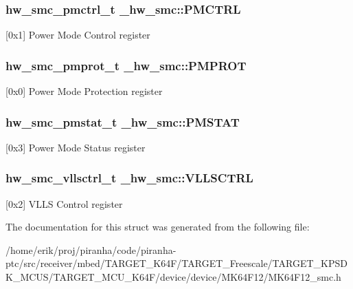 \subsubsection[{\texorpdfstring{P\+M\+C\+T\+RL}{PMCTRL}}]{ {\bf hw\+\_\+smc\+\_\+pmctrl\+\_\+t} \+\_\+hw\+\_\+smc\+::\+P\+M\+C\+T\+RL}\hypertarget{struct__hw__smc_ab8716e4edafb265314978c3aa5387fc3}{}\label{struct__hw__smc_ab8716e4edafb265314978c3aa5387fc3}
\mbox{[}0x1\mbox{]} Power Mode Control register 
\subsubsection[{\texorpdfstring{P\+M\+P\+R\+OT}{PMPROT}}]{ {\bf hw\+\_\+smc\+\_\+pmprot\+\_\+t} \+\_\+hw\+\_\+smc\+::\+P\+M\+P\+R\+OT}\hypertarget{struct__hw__smc_aed2e076c47d58654e18030aeb33a8787}{}\label{struct__hw__smc_aed2e076c47d58654e18030aeb33a8787}
\mbox{[}0x0\mbox{]} Power Mode Protection register 
\subsubsection[{\texorpdfstring{P\+M\+S\+T\+AT}{PMSTAT}}]{ {\bf hw\+\_\+smc\+\_\+pmstat\+\_\+t} \+\_\+hw\+\_\+smc\+::\+P\+M\+S\+T\+AT}\hypertarget{struct__hw__smc_a1bff3e9303d6c0a5205e007a1e386860}{}\label{struct__hw__smc_a1bff3e9303d6c0a5205e007a1e386860}
\mbox{[}0x3\mbox{]} Power Mode Status register 
\subsubsection[{\texorpdfstring{V\+L\+L\+S\+C\+T\+RL}{VLLSCTRL}}]{ {\bf hw\+\_\+smc\+\_\+vllsctrl\+\_\+t} \+\_\+hw\+\_\+smc\+::\+V\+L\+L\+S\+C\+T\+RL}\hypertarget{struct__hw__smc_ad94d9a89e7ad02829de04774bb93b96c}{}\label{struct__hw__smc_ad94d9a89e7ad02829de04774bb93b96c}
\mbox{[}0x2\mbox{]} V\+L\+LS Control register 

The documentation for this struct was generated from the following file\+:\begin{DoxyCompactItemize}
\item 
/home/erik/proj/piranha/code/piranha-\/ptc/src/receiver/mbed/\+T\+A\+R\+G\+E\+T\+\_\+\+K64\+F/\+T\+A\+R\+G\+E\+T\+\_\+\+Freescale/\+T\+A\+R\+G\+E\+T\+\_\+\+K\+P\+S\+D\+K\+\_\+\+M\+C\+U\+S/\+T\+A\+R\+G\+E\+T\+\_\+\+M\+C\+U\+\_\+\+K64\+F/device/device/\+M\+K64\+F12/M\+K64\+F12\+\_\+smc.\+h\end{DoxyCompactItemize}
